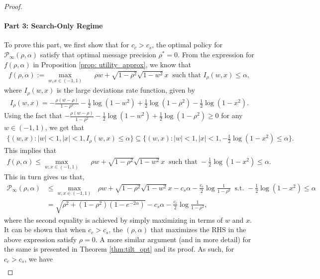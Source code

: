 \documentclass[12pt]{article}
\theoremstyle{definition}
\theoremstyle{remark}
\begin{document}
\begin{proof}
\paragraph{Part 3: Search-Only Regime}
To prove this part, we first show that for $c_c > c_s$, the optimal policy for $\mathcal{P}_\infty(\rho,\alpha)$ satisfy that optimal message precision $\rho^* = 0$. From the expression for $f(\rho, \alpha)$ in Proposition \ref{prop: utility_approx}, we know that
\begin{align*}
    f(\rho,\alpha) := \max_{w, x \in (-1,1)} & \ \ \ \rho w + \sqrt{1-\rho^2} \sqrt{1-w^2} x \ \text{ such that } I_{\rho}(w,x) \leq \alpha,
\end{align*}
where $I_{\rho}(w,x)$ is the large deviations rate function, given by
\begin{align*}
    I_{\rho}(w,x) = -\frac{\rho(w-\rho)}{1-\rho^2} - \frac{1}{2} \log(1-w^2)+ \frac{1}{2} \log(1-\rho^2) -\frac{1}{2} \log(1-x^2).
\end{align*}
Using the fact that $-\frac{\rho(w-\rho)}{1-\rho^2} - \frac{1}{2} \log(1-w^2)+ \frac{1}{2} \log(1-\rho^2) \geq 0$ for any $w\in (-1,1)$, we get that
\begin{align*}
    \big\{ (w,x) : |w| < 1, |x|<1, I_{\rho}(w,x) \leq \alpha \big\} \subseteq \Big\{ (w,x) : |w| < 1, |x|<1, -\frac{1}{2} \log(1-x^2)  \leq \alpha \Big\}.
\end{align*}
This implies that
\begin{align*}
    f(\rho,\alpha) \leq \max_{w, x \in (-1,1)} & \ \ \ \rho w + \sqrt{1-\rho^2} \sqrt{1-w^2} x \ \text{ such that } -\frac{1}{2} \log(1-x^2)  \leq \alpha.
\end{align*}
This in turn gives us that,
\begin{align*}
    \mathcal{P}_\infty (\rho, \alpha) &\leq \max_{w, x \in (-1,1)} \ \ \ \rho w + \sqrt{1-\rho^2} \sqrt{1-w^2} x - c_s \alpha - \frac{c_c}{2}\log \frac{1}{1-\rho^2} \ \text{ s.t. } -\frac{1}{2} \log(1-x^2)  \leq \alpha\\
    &= \sqrt{\rho^2 + (1-\rho^2) (1-e^{-2\alpha})} - c_s \alpha - \frac{c_c}{2}\log \frac{1}{1-\rho^2},
\end{align*}
where the second equality is achieved by simply maximizing in terms of $w$ and $x$. It can be shown that when $c_c>c_s$, the $(\rho,\alpha)$ that maximizes the RHS in the above expression satisfy $\rho = 0$. A more similar argument (and in more detail) for the same is presented in Theorem \ref{thm:tilt_opt} and its proof. As such, for $c_c>c_s$, we have
\begin{align*}

\end{align*}
\end{proof}
\end{document}
